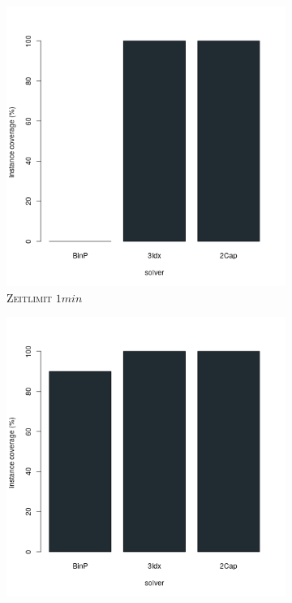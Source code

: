 \begin{figure}[H]
\centering

\begin{subfigure}[b]{0.3\textwidth}
\centering
\includegraphics[width=1.2\textwidth]{img/solver_instance_coverage_b=2_m_60s.png}
\caption{\textsc{Zeitlimit} $1min$}
\label{fig:instance_cov_b=2_m_a}
\end{subfigure}
\hfill
\begin{subfigure}[b]{0.3\textwidth}
\centering
\includegraphics[width=1.2\textwidth]{img/solver_instance_coverage_b=2_m_300s.png}

\end{subfigure}
\end{figure}
